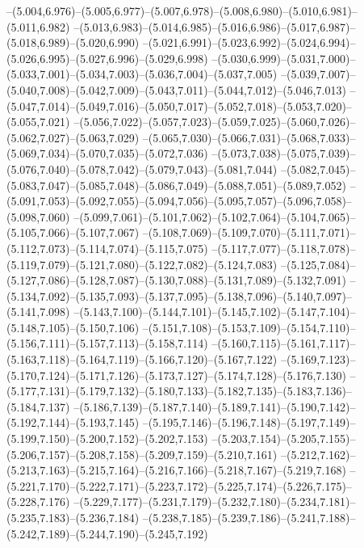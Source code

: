   --(5.004,6.976)--(5.005,6.977)--(5.007,6.978)--(5.008,6.980)--(5.010,6.981)--(5.011,6.982)%
  --(5.013,6.983)--(5.014,6.985)--(5.016,6.986)--(5.017,6.987)--(5.018,6.989)--(5.020,6.990)%
  --(5.021,6.991)--(5.023,6.992)--(5.024,6.994)--(5.026,6.995)--(5.027,6.996)--(5.029,6.998)%
  --(5.030,6.999)--(5.031,7.000)--(5.033,7.001)--(5.034,7.003)--(5.036,7.004)--(5.037,7.005)%
  --(5.039,7.007)--(5.040,7.008)--(5.042,7.009)--(5.043,7.011)--(5.044,7.012)--(5.046,7.013)%
  --(5.047,7.014)--(5.049,7.016)--(5.050,7.017)--(5.052,7.018)--(5.053,7.020)--(5.055,7.021)%
  --(5.056,7.022)--(5.057,7.023)--(5.059,7.025)--(5.060,7.026)--(5.062,7.027)--(5.063,7.029)%
  --(5.065,7.030)--(5.066,7.031)--(5.068,7.033)--(5.069,7.034)--(5.070,7.035)--(5.072,7.036)%
  --(5.073,7.038)--(5.075,7.039)--(5.076,7.040)--(5.078,7.042)--(5.079,7.043)--(5.081,7.044)%
  --(5.082,7.045)--(5.083,7.047)--(5.085,7.048)--(5.086,7.049)--(5.088,7.051)--(5.089,7.052)%
  --(5.091,7.053)--(5.092,7.055)--(5.094,7.056)--(5.095,7.057)--(5.096,7.058)--(5.098,7.060)%
  --(5.099,7.061)--(5.101,7.062)--(5.102,7.064)--(5.104,7.065)--(5.105,7.066)--(5.107,7.067)%
  --(5.108,7.069)--(5.109,7.070)--(5.111,7.071)--(5.112,7.073)--(5.114,7.074)--(5.115,7.075)%
  --(5.117,7.077)--(5.118,7.078)--(5.119,7.079)--(5.121,7.080)--(5.122,7.082)--(5.124,7.083)%
  --(5.125,7.084)--(5.127,7.086)--(5.128,7.087)--(5.130,7.088)--(5.131,7.089)--(5.132,7.091)%
  --(5.134,7.092)--(5.135,7.093)--(5.137,7.095)--(5.138,7.096)--(5.140,7.097)--(5.141,7.098)%
  --(5.143,7.100)--(5.144,7.101)--(5.145,7.102)--(5.147,7.104)--(5.148,7.105)--(5.150,7.106)%
  --(5.151,7.108)--(5.153,7.109)--(5.154,7.110)--(5.156,7.111)--(5.157,7.113)--(5.158,7.114)%
  --(5.160,7.115)--(5.161,7.117)--(5.163,7.118)--(5.164,7.119)--(5.166,7.120)--(5.167,7.122)%
  --(5.169,7.123)--(5.170,7.124)--(5.171,7.126)--(5.173,7.127)--(5.174,7.128)--(5.176,7.130)%
  --(5.177,7.131)--(5.179,7.132)--(5.180,7.133)--(5.182,7.135)--(5.183,7.136)--(5.184,7.137)%
  --(5.186,7.139)--(5.187,7.140)--(5.189,7.141)--(5.190,7.142)--(5.192,7.144)--(5.193,7.145)%
  --(5.195,7.146)--(5.196,7.148)--(5.197,7.149)--(5.199,7.150)--(5.200,7.152)--(5.202,7.153)%
  --(5.203,7.154)--(5.205,7.155)--(5.206,7.157)--(5.208,7.158)--(5.209,7.159)--(5.210,7.161)%
  --(5.212,7.162)--(5.213,7.163)--(5.215,7.164)--(5.216,7.166)--(5.218,7.167)--(5.219,7.168)%
  --(5.221,7.170)--(5.222,7.171)--(5.223,7.172)--(5.225,7.174)--(5.226,7.175)--(5.228,7.176)%
  --(5.229,7.177)--(5.231,7.179)--(5.232,7.180)--(5.234,7.181)--(5.235,7.183)--(5.236,7.184)%
  --(5.238,7.185)--(5.239,7.186)--(5.241,7.188)--(5.242,7.189)--(5.244,7.190)--(5.245,7.192)%
